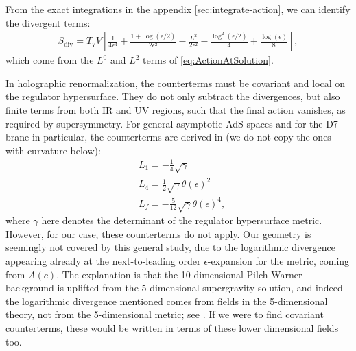 From the exact integrations in the appendix \ref{sec:integrate-action}, we can identify the divergent terms:
\begin{align} \label{eq:Sdiv}
 S_\text{div} = T_7 V 
        \left[ \frac{1}{4 \epsilon ^4} +\frac{1+\log \left(\epsilon/2\right)}{2 \epsilon ^2}-\frac{L^2}{2 \epsilon ^2}-\frac{ \log ^2\left(\epsilon/2\right)}{4}+\frac{\log (\epsilon )}{8} \right],
\end{align}
which come from the $L^0$ and $L^2$ terms of \eqref{eq:ActionAtSolution}. 

In holographic renormalization, the counterterms must be covariant and local on the regulator hypersurface. They do not only subtract the divergences, but also finite terms from both IR and UV regions, such that the final action vanishes, as required by supersymmetry. For general asymptotic AdS spaces and for the D7-brane in particular, the counterterms are derived in \cite{Karch:2005ms} (we do not copy the ones with curvature below):
\begin{align} \label{eq:Ls}
& L_{1}=-\frac{1}{4} \sqrt{\gamma} \nonumber\\
& L_{4}=\frac{1}{2} \sqrt{\gamma} \theta(\epsilon)^2 \nonumber\\
& L_{f}= -\frac{5}{12}\sqrt{\gamma} \theta(\epsilon)^4,
\end{align}
where $\gamma$ here denotes the determinant of the regulator hypersurface metric. 
However, for our case, these counterterms do not apply. Our geometry is seemingly not covered by this general study, due to the logarithmic divergence appearing already at the next-to-leading order $\epsilon$-expansion for the metric, coming from $A(c)$. The explanation is that the 10-dimensional Pilch-Warner background is uplifted from the 5-dimensional supergravity solution, and indeed the logarithmic divergence mentioned comes from fields in the 5-dimensional theory, not from the 5-dimensional metric; see \cite{Bobev:2013cja}. If we were to find covariant counterterms, these would be written in terms of these lower dimensional fields too.



